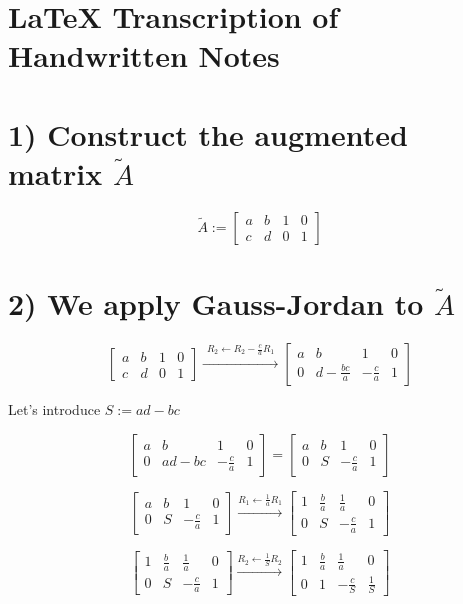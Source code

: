 \documentclass[a4paper, 12pt]{article}
\begin{document}
\section{LaTeX Transcription of Handwritten Notes}
\author{Transcription}



\section*{1) Construct the augmented matrix \(\widetilde{A}\)}
\[\widetilde{A} := \begin{bmatrix}
a & b & 1 & 0 \\
c & d & 0 & 1
\end{bmatrix}\]

\section*{2) We apply Gauss-Jordan to \(\widetilde{A}\)}
\[\begin{bmatrix}
a & b & 1 & 0 \\
c & d & 0 & 1
\end{bmatrix} \xrightarrow{\substack{R_2 \leftarrow R_2 - \frac{c}{a}R_1}}
\begin{bmatrix}
a & b & 1 & 0 \\
0 & d-\frac{bc}{a} & -\frac{c}{a} & 1
\end{bmatrix}\]

Let's introduce \(S := ad - bc\)

\[\begin{bmatrix}
a & b & 1 & 0 \\
0 & ad-bc & -\frac{c}{a} & 1
\end{bmatrix} = \begin{bmatrix}
a & b & 1 & 0 \\
0 & S & -\frac{c}{a} & 1
\end{bmatrix}\]

\[\begin{bmatrix}
a & b & 1 & 0 \\
0 & S & -\frac{c}{a} & 1
\end{bmatrix} \xrightarrow{R_1 \leftarrow \frac{1}{a}R_1}
\begin{bmatrix}
1 & \frac{b}{a} & \frac{1}{a} & 0 \\
0 & S & -\frac{c}{a} & 1
\end{bmatrix}\]

\[\begin{bmatrix}
1 & \frac{b}{a} & \frac{1}{a} & 0 \\
0 & S & -\frac{c}{a} & 1
\end{bmatrix} \xrightarrow{R_2 \leftarrow \frac{1}{S}R_2}
\begin{bmatrix}
1 & \frac{b}{a} & \frac{1}{a} & 0 \\
0 & 1 & -\frac{c}{S} & \frac{1}{S}
\end{bmatrix}\]
\end{document}
